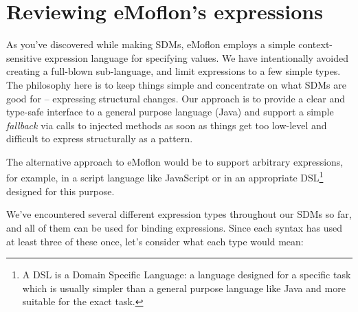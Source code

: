 \newpage
\chapter{Reviewing eMoflon's expressions}
\genHeader

As you've discovered while making SDMs, eMoflon employs a simple context-sensitive expression language for specifying  values. We have intentionally avoided
creating a full-blown sub-language, and limit expressions to a few simple types. The philosophy here is to keep things simple and concentrate on what SDMs are good for -- expressing structural
changes. Our approach is to provide a clear and type-safe interface to a general purpose language (Java) and support a simple \emph{fallback} via calls to
injected methods as soon as things get too low-level and difficult to express structurally as a pattern.

The alternative approach to eMoflon would be to support arbitrary expressions, for example, in a script language like JavaScript or in an appropriate
DSL\footnote{A DSL is a Domain Specific Language: a language designed for a specific task which is usually simpler than a general purpose language like Java and
more suitable for the exact task.} designed for this purpose. 

We've encountered several different expression types throughout our SDMs so far, and all of them can be used for binding expressions. Since each syntax has
used at least three of these once, let's consider what each type would mean:

